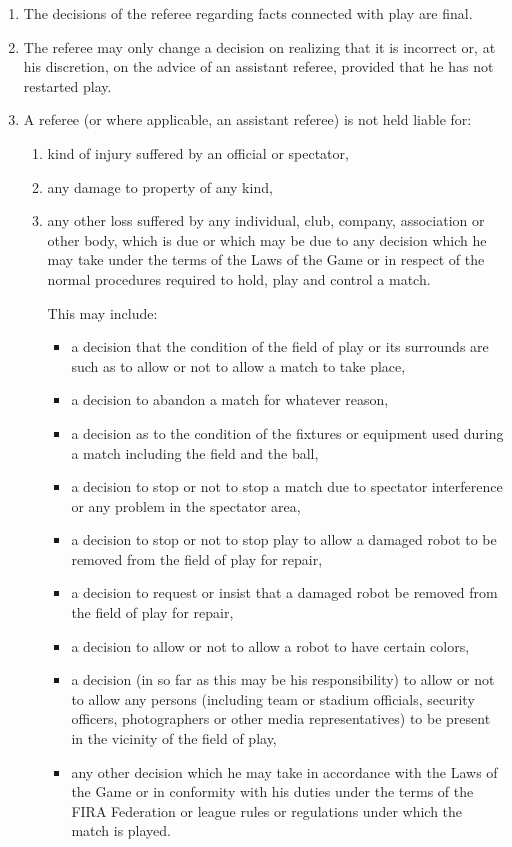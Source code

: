 \documentclass[12pt]{article}
\newcounter{law}[section]
\newenvironment{lawlist}[1][Law]{ %
  \begin{enumerate} %
    \renewcommand{\theenumi}{#1-\arabic{law}.\arabic{enumi}}} %
  {\end{enumerate}}
\begin{document}
\begin{lawlist}
\item The decisions of the referee regarding facts connected with play
  are final.

\item The referee may only change a decision on realizing that it is
  incorrect or, at his discretion, on the advice of an assistant
  referee, provided that he has not restarted play.

\item A referee (or where applicable, an assistant referee) is not
  held liable for: 
  \begin{enumerate}
    \item kind of injury suffered by an official or spectator,
    \item any damage to property of any kind,
    \item any other loss suffered by any individual, club, company,
      association or other body, which is due or which may be due to
      any decision which he may take under the terms of the Laws of
      the Game or in respect of the normal procedures required to
      hold, play and control a match.

      This may include:

      \begin{itemize}
      \item a decision that the condition of the field of play or its
        surrounds are such as to allow or not to allow a match to take
        place,
      \item a decision to abandon a match for whatever reason,
      \item a decision as to the condition of the fixtures or
        equipment used during a match including the field and the ball,
      \item a decision to stop or not to stop a match due to spectator
        interference or any problem in the spectator area,
      \item a decision to stop or not to stop play to allow a damaged
        robot to be removed from the field of play for repair,
      \item a decision to request or insist that a damaged robot be
        removed from the field of play for repair,
      \item a decision to allow or not to allow a robot to have
        certain colors,
      \item a decision (in so far as this may be his responsibility)
        to allow or not to allow any persons (including team or
        stadium officials, security officers, photographers or other
        media representatives) to be present in the vicinity of the
        field of play,
      \item any other decision which he may take in accordance with
        the Laws of the Game or in conformity with his duties under
        the terms of the FIRA Federation or league rules or
        regulations under which the match is played.
      \end{itemize}
    \end{enumerate}
\end{lawlist}
                                
\end{document}
